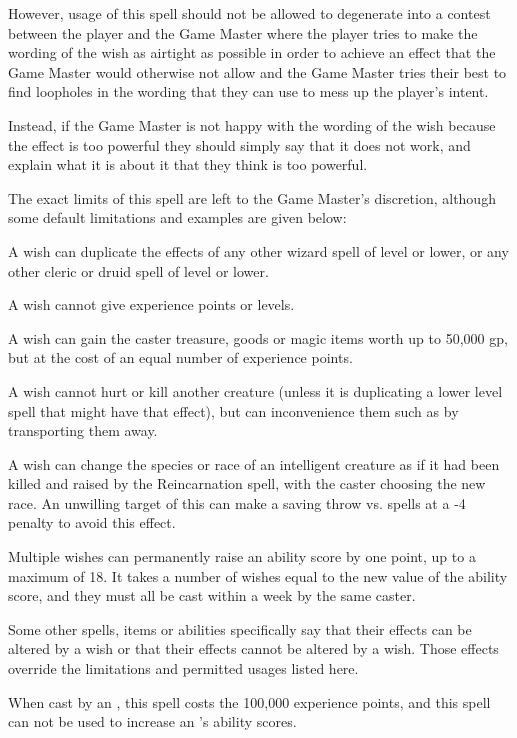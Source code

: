 \begin{multicols*}{2}
However, usage of this spell should not be allowed to degenerate into a contest between the player and the Game Master where the player tries to make the wording of the wish as airtight as possible in order to achieve an effect that the Game Master would otherwise not allow and the Game Master tries their best to find loopholes in the wording that they can use to mess up the player’s intent.

Instead, if the Game Master is not happy with the wording of the wish because the effect is too powerful they should simply say that it does not work, and explain what it is about it that they think is too powerful.

The exact limits of this spell are left to the Game Master’s discretion, although some default limitations and examples are given below:

A wish can duplicate the effects of any other wizard spell of  level or lower, or any other cleric or druid spell of  level or lower.

A wish cannot give experience points or levels.

A wish can gain the caster treasure, goods or magic items worth up to 50,000 gp, but at the cost of an equal number of experience points.

A wish cannot hurt or kill another creature (unless it is duplicating a lower level spell that might have that effect), but can inconvenience them such as by transporting them away.

A wish can change the species or race of an intelligent creature as if it had been killed and raised by the Reincarnation spell, with the caster choosing the new race. An unwilling target of this can make a saving throw vs. spells at a -4 penalty to avoid this effect.

Multiple wishes can permanently raise an ability score by one point, up to a maximum of 18. It takes a number of wishes equal to the new value of the ability score, and they must all be cast within a week by the same caster.

Some other spells, items or abilities specifically say that their effects can be altered by a wish or that their effects cannot be altered by a wish. Those effects override the limitations and permitted usages listed here.

When cast by an , this spell costs the  100,000 experience points, and this spell can not be used to increase an ’s ability scores.


\end{multicols*}

